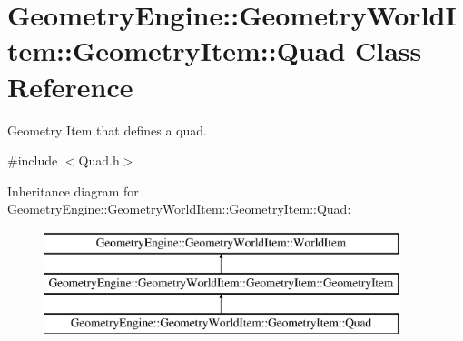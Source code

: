 \hypertarget{class_geometry_engine_1_1_geometry_world_item_1_1_geometry_item_1_1_quad}{}\section{Geometry\+Engine\+::Geometry\+World\+Item\+::Geometry\+Item\+::Quad Class Reference}
\label{class_geometry_engine_1_1_geometry_world_item_1_1_geometry_item_1_1_quad}


Geometry Item that defines a quad.  




{\ttfamily \#include $<$Quad.\+h$>$}

Inheritance diagram for Geometry\+Engine\+::Geometry\+World\+Item\+::Geometry\+Item\+::Quad\+:\begin{figure}[H]
\begin{center}
\leavevmode
\includegraphics[height=3.000000cm]{class_geometry_engine_1_1_geometry_world_item_1_1_geometry_item_1_1_quad}
\end{center}
\end{figure}
